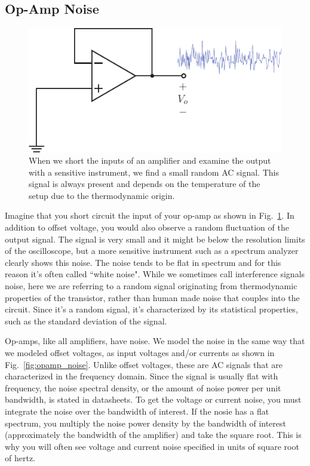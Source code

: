 \subsection{Op-Amp Noise}

\begin{figure}[tb]
\begin{center}
\includegraphics[scale=1]{opamp_unitygain_noise}
\end{center}
\caption{When we short the inputs of an amplifier and examine the output with a sensitive instrument, we find a small random AC signal.  This signal is always present and depends on the temperature of the setup due to the thermodynamic origin.} \label{fig:opamp_unitygain_noise}
\end{figure}

Imagine that you short circuit the input of your op-amp as shown in Fig.~\ref{fig:opamp_unitygain_noise}. In addition to offset voltage, you would also observe a random fluctuation of the output signal.  The signal is very small and it might be below the resolution limits of the oscilloscope, but a more sensitive instrument such as a spectrum analyzer clearly shows this noise.  The noise tends to be flat in spectrum and for this reason it's often called ``white noise".  While we sometimes call interference signals noise, here we are referring to a random signal originating from thermodynamic properties of the transistor, rather than human made noise that couples into the circuit.   Since it's a random signal, it's characterized by its statistical properties, such as the standard deviation of the signal.  

Op-amps, like all amplifiers, have noise.  We model the noise in the same way that we modeled offset voltages, as input voltages and/or currents as shown in Fig.~\ref{fig:opamp_noise}.  Unlike offset voltages, these are AC signals that are characterized in the frequency domain.  Since the signal is usually flat with frequency, the noise spectral density, or the amount of noise power per unit bandwidth, is stated in datasheets.  To get the voltage or current noise, you must integrate the noise over the bandwidth of interest.  If the nosie has a flat spectrum, you multiply the noise power density by the bandwidth of interest (approximately the bandwidth of the amplifier) and take the square root.  This is why you will often see voltage and current noise specified in units of square root of hertz.

